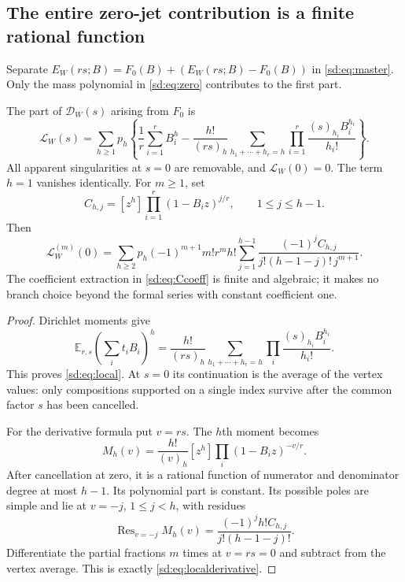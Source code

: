 \subsection{The entire zero-jet contribution is a finite rational function}
\label{sd:subsec:local}

Separate $E_W(rs;B)=F_0(B)+(E_W(rs;B)-F_0(B))$ in
\eqref{sd:eq:master}.  Only the mass polynomial in
\eqref{sd:eq:zero} contributes to the first part.

\begin{theorem}
\label{sd:thm:local}
The part of $\mathcal D_W(s)$ arising from $F_0$ is
\begin{equation}\label{sd:eq:local}
 \boxed{\displaystyle
 \mathcal L_W(s)=\sum_{h\ge1}p_h\left\{
 \frac1r\sum_{i=1}^r B_i^h-
 \frac{h!}{(rs)_h}
       \sum_{h_1+\cdots+h_r=h}
            \prod_{i=1}^r\frac{(s)_{h_i}B_i^{h_i}}{h_i!}
                                      \right\}.}
\end{equation}
All apparent singularities at $s=0$ are removable, and
$\mathcal L_W(0)=0$.  The term $h=1$ vanishes identically.  For
$m\ge1$, set
\begin{equation}\label{sd:eq:Ccoeff}
 C_{h,j}=[z^h]\prod_{i=1}^r(1-B_i z)^{j/r},
             \qquad 1\le j\le h-1.
\end{equation}
Then
\begin{equation}\label{sd:eq:localderivative}
 \boxed{\displaystyle
 \mathcal L_W^{(m)}(0)=
 \sum_{h\ge2}p_h(-1)^{m+1}m!r^m h!
  \sum_{j=1}^{h-1}
    \frac{(-1)^jC_{h,j}}{j!(h-1-j)!\,j^{m+1}}.}
\end{equation}
The coefficient extraction in \eqref{sd:eq:Ccoeff} is finite and
algebraic; it makes no branch choice beyond the formal series with
constant coefficient one.
\end{theorem}
\begin{proof}
Dirichlet moments give
\[
 \mathbb E_{r,s}\left(\sum_i t_iB_i\right)^h
  =\frac{h!}{(rs)_h}
       \sum_{h_1+\cdots+h_r=h}
                    \prod_i\frac{(s)_{h_i}B_i^{h_i}}{h_i!}.
\]
This proves \eqref{sd:eq:local}.  At $s=0$ its continuation is the
average of the vertex values: only compositions supported on a single
index survive after the common factor $s$ has been cancelled.

For the derivative formula put $v=rs$.  The $h$th moment becomes
\[
 M_h(v)=\frac{h!}{(v)_h}
                   [z^h]\prod_i(1-B_i z)^{-v/r}.
\]
After cancellation at zero, it is a rational function of numerator and
denominator degree at most $h-1$.  Its polynomial part is constant.
Its possible poles are simple and lie at $v=-j$, $1\le j<h$, with
residues
\[
 \operatorname{Res}_{v=-j}M_h(v)
   =\frac{(-1)^j h!C_{h,j}}{j!(h-1-j)!}.
\]
Differentiate the partial fractions $m$ times at $v=rs=0$ and subtract
from the vertex average.  This is exactly
\eqref{sd:eq:localderivative}.
\end{proof}

